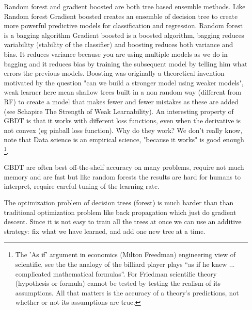 \documentclass[11pt]{article}
\begin{document}
Random forest and gradient boosted are both tree based ensemble methods. Like Random forest Gradient boosted creates an ensemble of decision tree to create more powerful predictive models for classification and regression. Random forest is a bagging algorithm Gradient boosted is a boosted algorithm, bagging reduces variability (stability of the classifier) and boosting reduces both variance and bias. It reduces variance because you are using multiple models as we do in bagging and it reduces bias by training the subsequent model by telling him what errors the previous models.
Boosting was originally a theoretical invention motivated by the question "can we build a stronger model using weaker models", weak learner here mean shallow trees built in a non random way (different from RF) to create a model that makes fewer and fewer mistakes as these are added (see Schapire The Strength of Weak Learnability). An interesting property of GBDT is that it works with different loss functions, even when the derivative is not convex (eg pinball loss function). %
Why do they work? We don't really know, note that Data science is an empirical science, "because it works" is good enough \footnote{The 'As if' argument in economics (Milton Freedman) engineering view of scientific, see the the analogy of the billiard player plays “as if he knew ... complicated mathematical formulas”. For Friedman scientific theory (hypothesis or formula) cannot be tested by testing the realism of its assumptions.  All that matters is the accuracy of a theory’s predictions, not whether or not its assumptions are true. }. %

GBDT are often best off-the-shelf accuracy on many problems, require not much memory and are fast but like random forests the results are hard for humans to interpret, require careful tuning of the learning rate.

The optimization problem of decision trees (forest) is much harder than than traditional optimization problem like back propagation which just do gradient descent. Since it is not easy to train all the trees at once we can use an additive strategy: fix what we have learned, and add one new tree at a time. 
\end{document}

